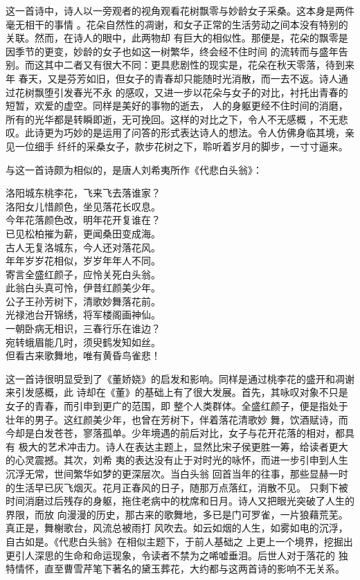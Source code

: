 \documentclass[12pt,a4paper]{article}
\begin{document}
		这一首诗中，诗人以一旁观者的视角观看花树飘零与妙龄女子采桑。这本身是两件毫无相干的事情
	。花朵自然性的凋谢，和女子正常的生活劳动之间本没有特别的关联。然而，在诗人的眼中，此两物却
	有巨大的相似性。那便是，花朵的飘零是因季节的更变，妙龄的女子也如这一树繁华，终会经不住时间
	的流转而与盛年告别。而这其中二者又有很大不同：更具悲剧性的现实是，花朵在秋天零落，待到来年
	春天，又是芬芳如旧，但女子的青春却只能随时光消散，而一去不返。诗人通过花树飘堕引发春光不永
	的感叹，又进一步以花朵与女子的对比，衬托出青春的短暂，欢爱的虚空。同样是美好的事物的逝去，
	人的身躯更经不住时间的消磨，所有的光华都是转瞬即逝，无可挽回。这样的对比之下，令人不无感概
	，不无悲叹。此诗更为巧妙的是运用了问答的形式表达诗人的想法。令人仿佛身临其境，亲见一位细手
	纤纤的采桑女子，款步花树之下，聆听着岁月的脚步，一寸寸逼来。

		与这一首诗颇为相似的，是唐人刘希夷所作《代悲白头翁》：

		\shortpoem{}{}{}
		洛阳城东桃李花，飞来飞去落谁家？\\
		洛阳女儿惜颜色，坐见落花长叹息。\\
		今年花落颜色改，明年花开复谁在？\\
		已见松柏摧为薪，更闻桑田变成海。\\
		古人无复洛城东，今人还对落花风。\\
		年年岁岁花相似，岁岁年年人不同。\\
		寄言全盛红颜子，应怜关死白头翁。\\
		此翁白头真可怜，伊昔红颜美少年。\\
		公子王孙芳树下，清歌妙舞落花前。\\
		光禄池台开锦绣，将军楼阁画神仙。\\
		一朝卧病无相识，三春行乐在谁边？\\
		宛转蛾眉能几时，须臾鹤发知如丝。\\
		但看古来歌舞地，唯有黄昏鸟雀悲！\\
		\endshortpoem

		这一首诗很明显受到了《董娇娆》的启发和影响。同样是通过桃李花的盛开和凋谢来引发感概，此
	诗却在《董》的基础上有了很大发展。首先，其咏叹对象不只是女子的青春，而引申到更广的范围，即
	整个人类群体。全盛红颜子，便是指处于壮年的男子。这红颜美少年，也曾在芳树下，伴着落花清歌妙
	舞，饮酒赋诗，而今却是白发苍苍，寥落孤单。少年境遇的前后对比，女子与花开花落的相对，都具有
	极大的艺术冲击力。诗人在表达主题上，显然比宋子侯更胜一筹，给读者更大的心灵震撼。其次，刘希
	夷的表达没有止于对时光的咏怀，而进一步引申到人生沉浮无常，世间繁华如梦的更深层次。当白头翁
	回首当年的往事，那些显赫一时的生活早已灰飞烟灭。花月正春风的日子，随那万点落红，消散不见。
	只剩下被时间消磨过后残存的身躯，拖住老病中的枕席和日月。诗人又把眼光突破了人生的界限，而放
	向漫漫的历史，那古来的歌舞地，多已是门可罗雀，一片狼藉荒芜。真正是，舞榭歌台，风流总被雨打
	风吹去。如云如烟的人生，如雾如电的沉浮，自古如是。《代悲白头翁》在相似主题下，于前人基础之
	上更上一个境界，挖掘出更引人深思的生命和命运现象，令读者不禁为之唏嘘垂泪。后世人对于落花的
	独特情怀，直至曹雪芹笔下著名的黛玉葬花，大约都与这两首诗的影响不无关系。
\end{document}
